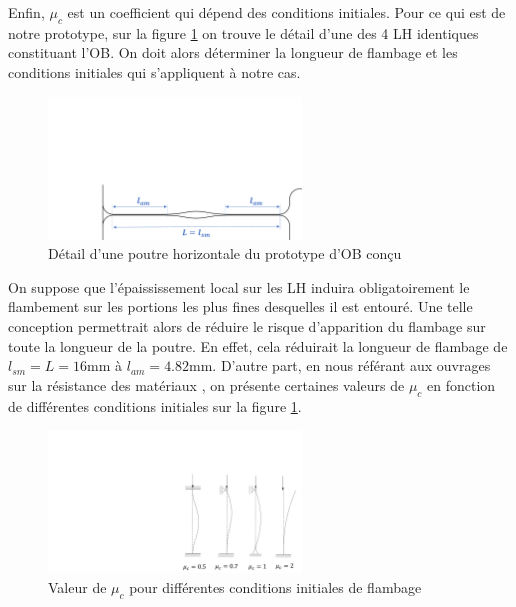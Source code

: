 Enfin, $\mu_c$ est un coefficient qui dépend des conditions initiales. Pour ce qui est de notre prototype, sur la figure \ref{fig:detail_poutre_horizontale} on trouve le détail d'une des 4 LH identiques constituant l'OB. On doit alors déterminer la longueur de flambage et les conditions initiales qui s'appliquent à notre cas.
\begin{figure}[!htb]
\begin{center}
    \captionsetup{justification=centering}
	\includegraphics[trim={7cm 0cm 0cm 12cm},clip, 					                 width=0.6\textwidth]{../Chap5/Figure/detail_poutre_horizontale.pdf}
	\caption{Détail d'une poutre horizontale du prototype d'OB conçu}
	\label{fig:detail_poutre_horizontale}
\end{center}	
\end{figure}    
On suppose que l'épaississement local sur les LH induira obligatoirement le flambement sur les portions les plus fines desquelles il est entouré. Une telle conception permettrait alors de réduire le risque d'apparition du flambage sur toute la longueur de la poutre. En effet, cela réduirait la longueur de flambage de $l_{sm}=L=16$mm à $l_{am}=4.82$mm. D'autre part, en nous référant aux ouvrages sur la résistance des matériaux \cite{Bourahla2011}, on présente certaines valeurs de $\mu_c$ en fonction de différentes conditions initiales sur la figure \ref{fig:detail_poutre_horizontale}.
\begin{figure}[!htb]
\begin{center}
    \captionsetup{justification=centering}
	\includegraphics[trim={15cm 0cm 0cm 6cm},clip, 					                 width=0.6\textwidth]{../Chap5/Figure/CI_flambement.pdf}
	\caption{Valeur de $\mu_c$ pour différentes conditions initiales de flambage \cite{Bourahla2011}}
	\label{fig:CI_flambement}
\end{center}	
\end{figure}    
